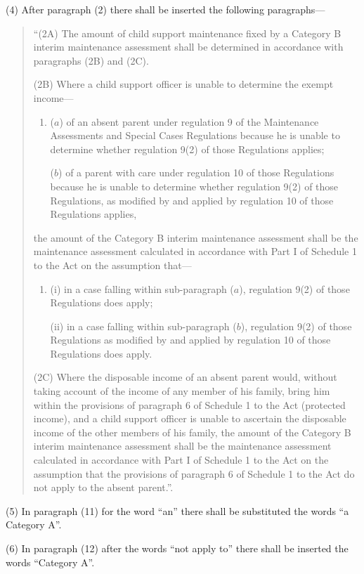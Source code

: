 \documentclass[a4paper]{article}
\begin{document}
(4) After paragraph (2) there shall be inserted the following paragraphs---
\begin{quotation}
“(2A) The amount of child support maintenance fixed by a Category B interim maintenance assessment shall be determined in accordance with paragraphs (2B) and (2C).

(2B) Where a child support officer is unable to determine the exempt income---
\begin{enumerate}\item[]
($a$) of an absent parent under regulation 9 of the Maintenance Assessments and Special Cases Regulations because he is unable to determine whether regulation 9(2) of those Regulations applies;

($b$) of a parent with care under regulation 10 of those Regulations because he is unable to determine whether regulation 9(2) of those Regulations, as modified by and applied by regulation 10 of those Regulations applies,
\end{enumerate}
the amount of the Category B interim maintenance assessment shall be the maintenance assessment calculated in accordance with Part I of Schedule 1 to the Act on the assumption that---
\begin{enumerate}\item[]
(i) in a case falling within sub-paragraph ($a$), regulation 9(2) of those Regulations does apply;

(ii) in a case falling within sub-paragraph ($b$), regulation 9(2) of those Regulations as modified by and applied by regulation 10 of those Regulations does apply.
\end{enumerate}

(2C) Where the disposable income of an absent parent would, without taking account of the income of any member of his family, bring him within the provisions of paragraph 6 of Schedule 1 to the Act (protected income), and a child support officer is unable to ascertain the disposable income of the other members of his family, the amount of the Category B interim maintenance assessment shall be the maintenance assessment calculated in accordance with Part I of Schedule 1 to the Act on the assumption that the provisions of paragraph 6 of Schedule 1 to the Act do not apply to the absent parent.”.
\end{quotation}

(5) In paragraph (11) for the word “an” there shall be substituted the words “a Category A”.

(6) In paragraph (12) after the words “not apply to” there shall be inserted the words “Category A”.
\end{document}
